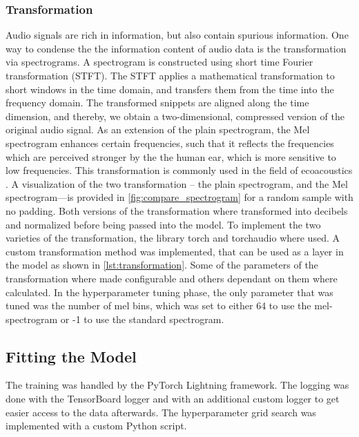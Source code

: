 \subsubsection{Transformation}%
Audio signals are rich in information, but also contain spurious information.
One way to condense the the information content of audio data is the transformation via spectrograms.
A spectrogram is constructed using short time Fourier transformation (STFT).
The STFT applies a mathematical transformation to short windows in the time domain, and transfers them from the time into the frequency domain.
The transformed snippets are aligned along the time dimension, and thereby, we obtain a two-dimensional, compressed version of the original audio signal.
As an extension of the plain spectrogram, the Mel spectrogram enhances certain frequencies, 
such that it reflects the frequencies which are perceived stronger by the the human ear, which is more sensitive to low frequencies.
This transformation is commonly used in the field of ecoacoustics \autocite[7]{stowellComputationalBioacousticsDeep2022}.
A visualization of the two transformation -- the plain spectrogram, and the Mel spectrogram---is provided in \autoref{fig:compare_spectrogram}
for a random sample with no padding. Both versions of the transformation where transformed into decibels and normalized before 
being passed into the model.
To implement the two varieties of the transformation, the library torch and torchaudio where used.
A custom transformation method was implemented, that can be used as a layer in the model as shown in 
\autoref{lst:transformation}. Some of the parameters of the transformation where made configurable
and others dependant on them where calculated. In the hyperparameter tuning phase, the only parameter
that was tuned was the number of mel bins, which was set to either 64 to use the mel-spectrogram or -1
to use the standard spectrogram.



\subsection{Fitting the Model}%

The training was handled by the PyTorch Lightning framework. The logging was done
with the TensorBoard logger and with an additional custom logger to get easier access to the
data afterwards. The hyperparameter grid search was implemented with a custom Python script.

